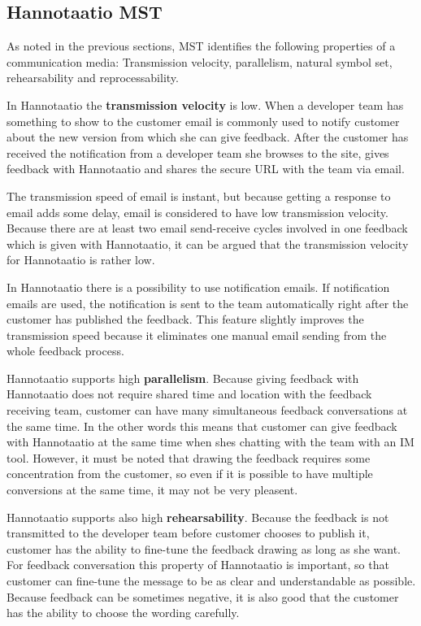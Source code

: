 \documentclass[english,12pt,a4paper,pdftex]{article}
\begin{document}
\subsection{Hannotaatio MST}

As noted in the previous sections, \ac{MST} identifies the following properties of a communication media: Transmission velocity, parallelism, natural symbol set, rehearsability and reprocessability.

In Hannotaatio the \textbf{transmission velocity} is low. When a developer team has something to show to the customer email is commonly used to notify customer about the new version from which she can give feedback. After the customer has received the notification from a developer team she browses to the site, gives feedback with Hannotaatio and shares the secure \ac{URL} with the team via email.

The transmission speed of email is instant, but because getting a response to email adds some delay, email is considered to have low transmission velocity. Because there are at least two email send-receive cycles involved in one feedback which is given with Hannotaatio, it can be argued that the transmission velocity for Hannotaatio is rather low.

In Hannotaatio there is a possibility to use notification emails. If notification emails are used, the notification is sent to the team automatically right after the customer has published the feedback. This feature slightly improves the transmission speed because it eliminates one manual email sending from the whole feedback process.

Hannotaatio supports high \textbf{parallelism}. Because giving feedback with Hannotaatio does not require shared time and location with the feedback receiving team, customer can have many simultaneous feedback conversations at the same time. In the other words this means that customer can give feedback with Hannotaatio at the same time when shes chatting with the team with an \ac{IM} tool. However, it must be noted that drawing the feedback requires some concentration from the customer, so even if it is possible to have multiple conversions at the same time, it may not be very pleasent.

Hannotaatio supports also high \textbf{rehearsability}. Because the feedback is not transmitted to the developer team before customer chooses to publish it, customer has the ability to fine-tune the feedback drawing as long as she want. For feedback conversation this property of Hannotaatio is important, so that customer can fine-tune the message to be as clear and understandable as possible. Because feedback can be sometimes negative, it is also good that the customer has the ability to choose the wording carefully.
\end{document}
